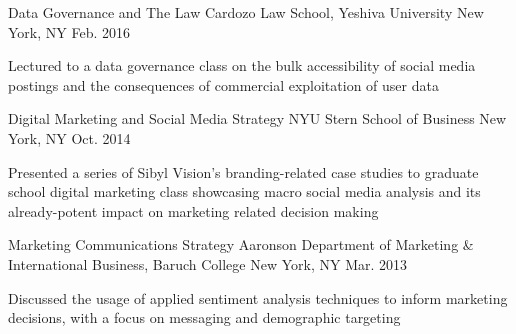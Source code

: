 

\begin{cventries}

  \cventry
    {Data Governance and The Law} %
    {Cardozo Law School, Yeshiva University} %
    {New York, NY} %
    {Feb. 2016} %
    {
      \begin{cvitems} %
        \item {Lectured to a data governance class on the bulk accessibility of social media postings and the consequences of commercial exploitation of user data}
      \end{cvitems}
    }

  \cventry
    {Digital Marketing and Social Media Strategy} %
    {NYU Stern School of Business} %
    {New York, NY} %
    {Oct. 2014} %
    {
      \begin{cvitems} %
        \item {Presented a series of Sibyl Vision's branding-related case studies to graduate school digital marketing class showcasing macro social media analysis and its already-potent impact on marketing related decision making}
      \end{cvitems}
    }

  \cventry
    {Marketing Communications Strategy} %
    {Aaronson Department of Marketing \& International Business, Baruch College} %
    {New York, NY} %
    {Mar. 2013} %
    {
      \begin{cvitems} %
        \item {Discussed the usage of applied sentiment analysis techniques to inform marketing decisions, with a focus on messaging and demographic targeting}
      \end{cvitems}
    }


\end{cventries}
